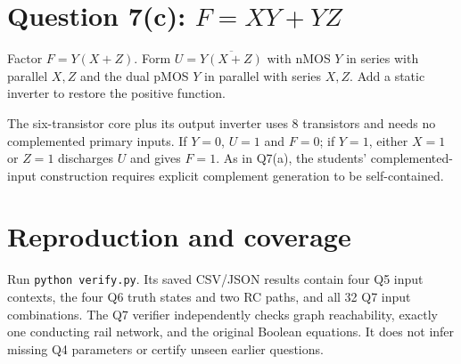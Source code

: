 \documentclass[10pt]{article}
\newcommand{\mos}[4]{\begin{scope}[shift={(#1,#2)}]
\draw(0,.24)--(0,-.24);\draw(0,.2)--(.25,.2)--(.25,.5);\draw(0,-.2)--(.25,-.2)--(.25,-.5);
\draw(-.16,.23)--(-.16,-.23);
\ifnum#4=1\draw(-.26,0)circle(.06);\draw(-.75,0)--(-.32,0);\else\draw(-.75,0)--(-.16,0);\fi
\node[anchor=east,font=\scriptsize]at(-.76,0){$#3$};\end{scope}}
\newcommand{\gnd}[2]{\draw(#1,#2)--(#1,{#2-.12});\draw({#1-.17},{#2-.12})--({#1+.17},{#2-.12});\draw({#1-.11},{#2-.2})--({#1+.11},{#2-.2});}
\newcommand{\rail}[3]{\draw(#1,#2)--(#1,{#2+.14});\node[above,font=\scriptsize]at(#1,{#2+.14}){$#3$};}
\begin{document}
\newpage\section*{Question 7(c): $F=XY+YZ$}
Factor $F=Y(X+Z)$. Form $U=\overline{Y(X+Z)}$ with nMOS $Y$ in series with parallel $X,Z$ and the dual pMOS $Y$ in parallel with series $X,Z$. Add a static inverter to restore the positive function.
\begin{center}\end{center}
The six-transistor core plus its output inverter uses 8 transistors and needs no complemented primary inputs. If $Y=0$, $U=1$ and $F=0$; if $Y=1$, either $X=1$ or $Z=1$ discharges $U$ and gives $F=1$. As in Q7(a), the students' complemented-input construction requires explicit complement generation to be self-contained.

\section*{Reproduction and coverage}
Run \texttt{python verify.py}. Its saved CSV/JSON results contain four Q5 input contexts, the four Q6 truth states and two RC paths, and all 32 Q7 input combinations. The Q7 verifier independently checks graph reachability, exactly one conducting rail network, and the original Boolean equations. It does not infer missing Q4 parameters or certify unseen earlier questions.
\end{document}

